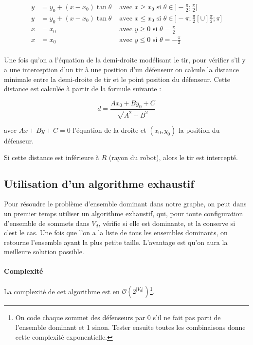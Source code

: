 \documentclass[12pt]{article}
\begin{document}
\begin{align*}
y & =  y_0 + (x - x_0)\tan \theta & \text{ avec $x \geqslant x_0$ si } \theta \in ]-\frac{\pi}{2}; \frac{\pi}{2} [ \\
y & = y_0 + (x - x_0)\tan \theta & \text{ avec $x \leqslant x_0$ si } \theta \in ]-\pi; \frac{\pi}{2}[ \cup ]\frac{\pi}{2}; \pi ] \\
x & = x_0  & \text{ avec $y \geqslant 0$ si } \theta = \frac{\pi}{2} \\
x & = x_0  & \text{ avec $y \leqslant 0$ si } \theta = -\frac{\pi}{2} \\
\end{align*}

Une fois qu'on a l'équation de la demi-droite modélisant le tir, pour vérifier s'il y a une interception d'un tir à une position d'un défenseur on calcule la distance minimale entre la demi-droite de tir et le point position du défenseur. Cette distance est calculée à partir de la formule suivante :

\begin{equation*}
  d = \frac{Ax_0 + By_0 + C}{\sqrt{A^2+B^2}}
\end{equation*}

avec $Ax+By+C = 0$ l'équation de la droite et $(x_0, y_0)$ la position du défenseur.

 Si cette distance est inférieure à $R$ (rayon du robot), alors le tir est intercepté.

\subsection{Utilisation d'un algorithme exhaustif}
Pour résoudre le problème d'ensemble dominant dans notre graphe, on peut dans un premier temps utiliser un algorithme exhaustif, qui, pour toute configuration d'ensemble de sommets dans $V_d$, vérifie si elle est dominante, et la conserve si c'est le cas. Une fois que l'on a la liste de tous les ensembles dominants, on retourne l'ensemble ayant la plus petite taille. L'avantage est qu'on aura la meilleure solution possible.

\paragraph{Complexité} La complexité de cet algorithme est en $\mathcal{O}(2^{|V_d|})$\footnote{On code chaque sommet des défenseurs par 0 s'il ne fait pas parti de l'ensemble dominant et 1 sinon. Tester ensuite toutes les combinaisons donne cette complexité exponentielle.}.
\end{document}
